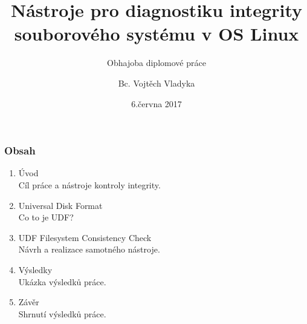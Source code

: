 \documentclass[aspectratio=169]{beamer}
\title{Nástroje pro diagnostiku integrity souborového systému v OS Linux}
\subtitle{Obhajoba diplomové práce}
\author{Bc. Vojtěch Vladyka}
\date{6.června 2017}
\begin{document}
	\addtolength{\textwidth}{-20pt}
	\addtolength{\textheight}{-20pt}
  \frame{\titlepage}
   
  \begin{frame}
    \frametitle{Obsah}
	\vspace{40 pt}
	\begin{enumerate}
	  \Large\item Úvod
	  \\ \textcolor{ExecusharesGrey}{\footnotesize\hspace{1em}\large Cíl práce a nástroje kontroly integrity.}	
	  \Large\item Universal Disk Format
	  \\ \textcolor{ExecusharesGrey}{\footnotesize\hspace{1em}\large Co to je UDF?}
	  \Large\item UDF Filesystem Consistency Check
	  \\ \textcolor{ExecusharesGrey}{\footnotesize\hspace{1em}\large Návrh a realizace samotného nástroje.}
	  \Large\item Výsledky
	  \\ \textcolor{ExecusharesGrey}{\footnotesize\hspace{1em}\large Ukázka výsledků práce.}
	  \Large\item Závěr
	  \\ \textcolor{ExecusharesGrey}{\footnotesize\hspace{1em}\large Shrnutí výsledků práce.}
	\end{enumerate}
	\end{frame}
\end{document}
